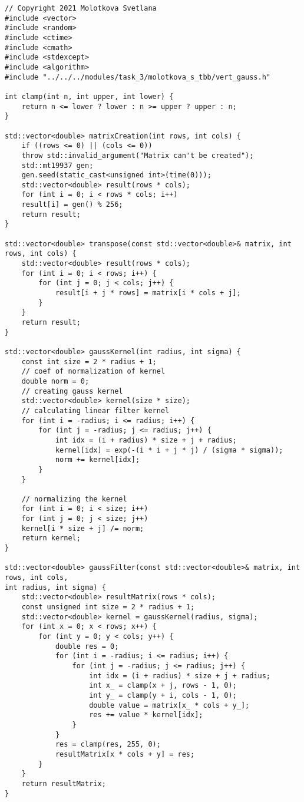 \documentclass{report}
\begin{document}
\begin{lstlisting}
// Copyright 2021 Molotkova Svetlana
#include <vector>
#include <random>
#include <ctime>
#include <cmath>
#include <stdexcept>
#include <algorithm>
#include "../../../modules/task_3/molotkova_s_tbb/vert_gauss.h"

int clamp(int n, int upper, int lower) {
	return n <= lower ? lower : n >= upper ? upper : n;
}

std::vector<double> matrixCreation(int rows, int cols) {
	if ((rows <= 0) || (cols <= 0))
	throw std::invalid_argument("Matrix can't be created");
	std::mt19937 gen;
	gen.seed(static_cast<unsigned int>(time(0)));
	std::vector<double> result(rows * cols);
	for (int i = 0; i < rows * cols; i++)
	result[i] = gen() % 256;
	return result;
}

std::vector<double> transpose(const std::vector<double>& matrix, int rows, int cols) {
	std::vector<double> result(rows * cols);
	for (int i = 0; i < rows; i++) {
		for (int j = 0; j < cols; j++) {
			result[i + j * rows] = matrix[i * cols + j];
		}
	}
	return result;
}

std::vector<double> gaussKernel(int radius, int sigma) {
	const int size = 2 * radius + 1;
	// coef of normalization of kernel
	double norm = 0;
	// creating gauss kernel
	std::vector<double> kernel(size * size);
	// calculating linear filter kernel
	for (int i = -radius; i <= radius; i++) {
		for (int j = -radius; j <= radius; j++) {
			int idx = (i + radius) * size + j + radius;
			kernel[idx] = exp(-(i * i + j * j) / (sigma * sigma));
			norm += kernel[idx];
		}
	}
	
	// normalizing the kernel
	for (int i = 0; i < size; i++)
	for (int j = 0; j < size; j++)
	kernel[i * size + j] /= norm;
	return kernel;
}

std::vector<double> gaussFilter(const std::vector<double>& matrix, int rows, int cols,
int radius, int sigma) {
	std::vector<double> resultMatrix(rows * cols);
	const unsigned int size = 2 * radius + 1;
	std::vector<double> kernel = gaussKernel(radius, sigma);
	for (int x = 0; x < rows; x++) {
		for (int y = 0; y < cols; y++) {
			double res = 0;
			for (int i = -radius; i <= radius; i++) {
				for (int j = -radius; j <= radius; j++) {
					int idx = (i + radius) * size + j + radius;
					int x_ = clamp(x + j, rows - 1, 0);
					int y_ = clamp(y + i, cols - 1, 0);
					double value = matrix[x_ * cols + y_];
					res += value * kernel[idx];
				}
			}
			res = clamp(res, 255, 0);
			resultMatrix[x * cols + y] = res;
		}
	}
	return resultMatrix;
}


\end{lstlisting}
\end{document}
